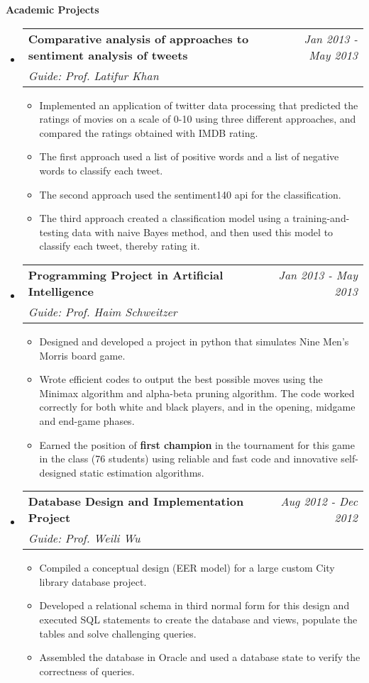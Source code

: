 \documentclass[letterpaper,11pt]{article}
\makeatletter
\newcommand{\resitem}[1]{\item[\ding{226}] #1 \vspace{-2pt}}
\newcommand{\resheading}[1]{{\large \colorbox{mygrey}{\begin{minipage}{\textwidth}{\textbf{#1 \vphantom{p\^{E}}}}\end{minipage}}}}
\newcommand{\ressubheading}[4]{
\begin{tabular*}{7.0in}{l@{\extracolsep{\fill}}r}
		\textbf{#1} & #2 \\
		\textit{#3} & \textit{#4} \\
\end{tabular*}\vspace{-6pt}}
\makeatother
\begin{document}
\resheading{Academic Projects}
\begin{itemize}

\item
	\ressubheading{Comparative analysis of approaches to sentiment analysis of tweets}{\textit{Jan 2013 - May 2013}}{Guide: Prof. Latifur Khan}{}
	\begin{itemize}
		\resitem{Implemented an application of twitter data processing that predicted the ratings of movies on a scale of 0-10 using three different approaches, and compared the ratings obtained with IMDB rating.}
		\resitem{The first approach used a list of positive words and a list of negative words to classify each tweet.}
		\resitem{The second approach used the sentiment140 api for the classification.}
		\resitem{The third approach created a classification model using a training-and-testing data with naive Bayes method, and then used this model to classify each tweet, thereby rating it.}
	\end{itemize}


\item
	\ressubheading{Programming Project in Artificial Intelligence}{\textit{Jan 2013 - May 2013}}{Guide: Prof. Haim Schweitzer}{}
	\begin{itemize}
		\resitem{Designed and developed a project in python that simulates Nine Men's Morris board game.}
		\resitem{Wrote efficient codes to output the best possible moves using the Minimax algorithm and alpha-beta pruning algorithm. The code worked correctly for both white and black players, and in the opening, midgame and end-game phases.}
		\resitem{Earned the position of \textbf{first champion} in the tournament for this game in the class (76 students) using reliable and fast code and innovative self-designed static estimation algorithms.}
	\end{itemize}

\item
	\ressubheading{Database Design and Implementation Project}{\textit{Aug 2012 - Dec 2012}}{Guide: Prof. Weili Wu}{}
	\begin{itemize}
		\resitem{Compiled a conceptual design (EER model) for a large custom City library database project.}
		\resitem{Developed a relational schema in third normal form for this design and executed SQL statements to create the database and views, populate the tables and solve challenging queries.}
		\resitem{Assembled the database in Oracle and used a database state to verify the correctness of queries.}
	\end{itemize}


\end{itemize}
\end{document}
